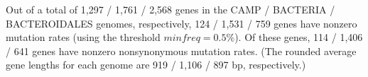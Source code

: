 Out of a total of 1,297 / 1,761 / 2,568 genes in the CAMP / BACTERIA / BACTEROIDALES genomes, respectively, 124 / 1,531 / 759 genes have nonzero mutation rates (using the threshold $minfreq=0.5\%$). Of these genes, 114 / 1,406 / 641 genes have nonzero nonsynonymous mutation rates. (The rounded average gene lengths for each genome are 919 / 1,106 / 897 bp, respectively.)\endinput